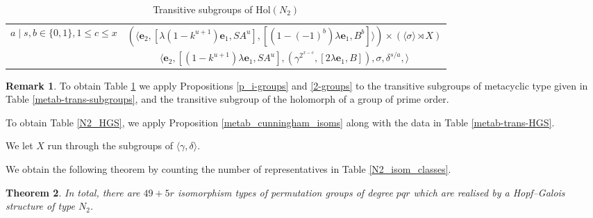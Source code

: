 \documentclass[a4paper,reqno]{amsart}
\newtheorem{theorem}{Theorem}[section]
\theoremstyle{definition}
\newtheorem{remark}[theorem]{Remark}
\newcommand{\e}{\textbf{e}}
\newcommand{\Hol}{\mathrm{Hol}}
\begin{document}
\begin{table}
{\begin{tabular}{|c|c|}
    $a \mid s, b \in \{0,1\}, 1 \leq c \leq x$ & $(\langle \e_2, [\lambda (1-k^{u+1})\e_1, SA^u], [(1-(-1)^b)\lambda\e_1, B^b] \rangle) \times  (\langle \sigma \rangle \rtimes X)$\\
    & $\langle \e_2, [(1-k^{u+1})\lambda\e_1, SA^u], (\gamma^{2^{x-c}},[2\lambda\e_1, B]), \sigma, \delta^{s/a}, \rangle$\\
\hline
\end{tabular}
}
    \vspace{5mm}
    \caption{Transitive subgroups of $\Hol(N_2)$}
    \label{N2_trans_groups}
\end{table}
\begin{remark}\label{table_data}
    To obtain Table \ref{N2_trans_groups} we apply Propositions \ref{p_i-groups} and \ref{2-groups} to the transitive subgroups of metacyclic type given in Table \ref{metab-trans-subgroups}, and the transitive subgroup of the holomorph of a group of prime order.

    To obtain Table \ref{N2_HGS}, we apply Proposition \ref{metab_cunningham_isoms} along with the data in Table \ref{metab-trans-HGS}.

    We let $X$ run through the subgroups of $\langle \gamma, \delta \rangle$.
\end{remark}
We obtain the following theorem by counting the number of representatives in Table \ref{N2_isom_classes}.
\begin{theorem}\label{N2_tot}
    In total, there are $49+5r$ isomorphism types of permutation groups of degree $pqr$ which are realised by a Hopf--Galois structure of type $N_2$.
\end{theorem}
\end{document}
